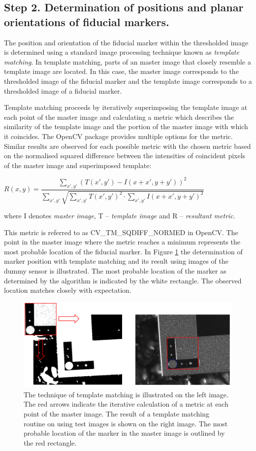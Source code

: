 \subsection{Step 2. Determination of positions and planar orientations of fiducial markers.}
The position and orientation of the fiducial marker within the thresholded image is determined using a standard image processing technique known as \emph{template matching}. In template matching, parts of an master image that closely resemble a template image are located. In this case, the master image corresponds to the thresholded image of the fiducial marker and the template image corresponds to a thresholded image of a fiducial marker.

Template matching proceeds by iteratively superimposing the template image at each point of the master image and calculating a metric which describes the similarity of the template image and the portion of the master image with which it coincides. The OpenCV package provides multiple options for the metric. Similar results are observed for each possible metric with the chosen metric based on the normalised squared difference between the intensities of coincident pixels of the master image and superimposed template:


\begin{center}
$R(x,y)=\dfrac{\sum_{x',y'}^{}(T(x',y')-I(x+x',y+y'))^{2}}{\sum_{x',y'}^{}\sqrt{\sum_{x',y'}^{}T(x',y')^{2}\cdot\sum_{x',y'}^{}I(x+x',y+y')^{2}}}$
\end{center}
where I denotes \emph{master image}, T -- \emph{template image} and R -- \emph{resultant metric}.

This metric is referred to as CV\_TM\_SQDIFF\_NORMED in OpenCV. The point in the master image where the metric reaches a minimum represents the most probable location of the fiducial marker. In Figure \ref{fig:template_matching} the determination of marker position with template matching and its result using images of the dummy sensor is illustrated. The most probable location of the marker as determined by the algorithm is indicated by the white rectangle. The observed location matches closely with expectation.

\begin{figure}[ht]\centering
\includegraphics[width=0.9\linewidth]{Data/Control_Software/Template_matching.png}
\caption{The technique of template matching is illustrated on the left image. The red arrows indicate the iterative calculation of a metric at each point of the master image. The result of a template matching routine on using test images is shown on the right image. The most probable location of the marker in the master image is outlined by the red rectangle.}
\label{fig:template_matching}
\end{figure}

